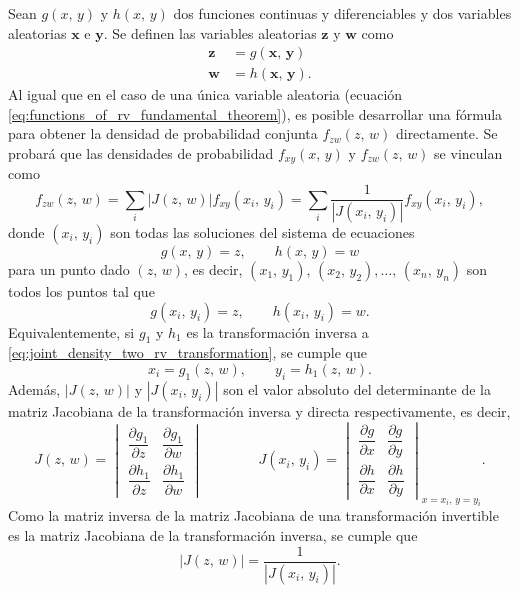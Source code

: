 \documentclass[a4paper]{report}
\newcommand{\x}{\mathbf{x}}
\newcommand{\y}{\mathbf{y}}
\newcommand{\w}{\mathbf{w}}
\newcommand{\z}{\mathbf{z}}
\begin{document}
Sean \(g(x,\,y)\) y \(h(x,\,y)\) dos funciones continuas y diferenciables y dos variables aleatorias \(\x\) e \(\y\). Se definen las variables aleatorias \(\z\) y \(\w\) como
\begin{align*}
 \z&=g(\x,\,\y)\\
 \w&=h(\x,\,\y).
\end{align*}
Al igual que en el caso de una única variable aleatoria (ecuación \ref{eq:functions_of_rv_fundamental_theorem}), es posible desarrollar una fórmula para obtener la densidad de probabilidad conjunta \(f_{zw}(z,\,w)\) directamente. Se probará que las densidades de probabilidad \(f_{xy}(x,\,y)\) y \(f_{zw}(z,\,w)\) se vinculan como
\begin{equation}\label{eq:joint_density_two_funcions_two_rv}
 f_{zw}(z,\,w)=\sum_{i}|J(z,\,w)|f_{xy}(x_i,\,y_i)=\sum_{i}\frac{1}{|J(x_i,\,y_i)|}f_{xy}(x_i,\,y_i),
\end{equation}
donde \((x_i,\,y_i)\) son todas las soluciones del sistema de ecuaciones
\begin{equation}\label{eq:joint_density_two_rv_transformation}
 g(x,\,y)=z,\qquad h(x,\,y)=w
\end{equation}
para un punto dado \((z,\,w)\), es decir, \((x_1,\,y_1),\,(x_2,\,y_2),\dots,\,(x_n,\,y_n)\) son todos los puntos tal que
\[
 g(x_i,\,y_i)=z,\qquad h(x_i,\,y_i)=w.
\]
Equivalentemente, si \(g_1\) y \(h_1\) es la transformación inversa a \ref{eq:joint_density_two_rv_transformation}, se cumple que
\begin{equation}\label{eq:joint_density_two_rv_probability_inverse_transform}
 x_i=g_1(z,\,w),\qquad y_i=h_1(z,\,w). 
\end{equation}
Además, \(|J(z,\,w)|\) y \(|J(x_i,\,y_i)|\) son el valor absoluto del determinante de la matriz Jacobiana de la transformación inversa y directa respectivamente, es decir,
\begingroup
\renewcommand*{\arraystretch}{2.2}
\[
 J(z,\,w)=
 \begin{vmatrix}
    \dfrac{\partial g_1}{\partial z} & \dfrac{\partial g_1}{\partial w} \\
    \dfrac{\partial h_1}{\partial z} & \dfrac{\partial h_1}{\partial w}
\end{vmatrix}
\qquad\qquad
J(x_i,\,y_i)=
 \begin{vmatrix}
    \dfrac{\partial g}{\partial x} & \dfrac{\partial g}{\partial y} \\
    \dfrac{\partial h}{\partial x} & \dfrac{\partial h}{\partial y}
\end{vmatrix}_{x=x_i,\,y=y_i}.
\]
\endgroup
Como la matriz inversa de la matriz Jacobiana de una transformación invertible es la matriz Jacobiana de la transformación inversa, se cumple que
\[
 |J(z,\,w)|=\frac{1}{|J(x_i,\,y_i)|}.
\]
\end{document}
